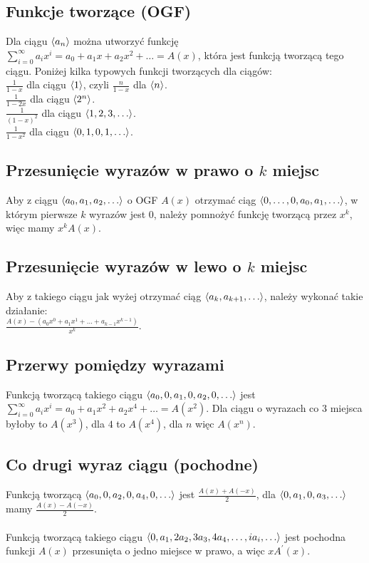 \subsection*{Funkcje tworzące (OGF)}
Dla ciągu $\left\langle a_n \right\rangle$ można utworzyć funkcję 
$\sum\limits_{i=0}^{\infty} a_i x^i = a_0 + a_1 x + a_2 x^2 + \ldots = A(x)$, która
jest funkcją tworzącą tego ciągu. Poniżej kilka typowych funkcji tworzących dla
ciągów: \\
$\frac{1}{1-x}$ dla ciągu $\left\langle 1 \right\rangle$, czyli $\frac{n}{1-x}$ dla $\left\langle n \right\rangle$. \\
$\frac{1}{1-2x}$ dla ciągu $\left\langle 2^n \right\rangle$. \\
$\frac{1}{(1-x)^2}$ dla ciągu $\left\langle 1, 2, 3, \ldots \right\rangle$. \\
$\frac{1}{1-x^2}$ dla ciągu $\left\langle 0, 1, 0, 1, \ldots \right\rangle$. \\

\subsection*{Przesunięcie wyrazów w prawo o $k$ miejsc}
Aby z ciągu $\left\langle a_0, a_1, a_2, \ldots \right\rangle$ o OGF $A(x)$ otrzymać ciąg 
$\left\langle 0, \ldots, 0, a_0, a_1, \ldots \right\rangle$, w którym pierwsze $k$ wyrazów jest $0$,
należy pomnożyć funkcję tworzącą przez $x^k$, więc mamy $x^k A(x)$.

\subsection*{Przesunięcie wyrazów w lewo o $k$ miejsc}
Aby z takiego ciągu jak wyżej otrzymać ciąg $\left\langle a_{k}, a_{k+1}, \ldots \right\rangle$,
należy wykonać takie działanie: \\
$\frac{A(x) - \left( a_0 x^0 + a_1 x^1 + \ldots + a_{k-1} x^{k-1} \right)}{x^k}$.

\subsection*{Przerwy pomiędzy wyrazami}
Funkcją tworzącą takiego ciągu $\left\langle a_0, 0, a_1, 0, a_2, 0, \ldots \right\rangle$ jest
$\sum\limits_{i=0}^{\infty} a_i x^i = a_0 + a_1 x^2 + a_2 x^4 + \ldots = A(x^2)$.
Dla ciągu o wyrazach co $3$ miejsca byłoby to $A(x^3)$, dla $4$ to $A(x^4)$, dla
$n$ więc $A(x^n)$.

\subsection*{Co drugi wyraz ciągu (pochodne)}
Funkcją tworzącą $\left\langle a_0, 0, a_2, 0, a_4, 0, \ldots \right\rangle$ jest 
$\frac{A(x) + A(-x)}{2}$, dla $\left\langle 0, a_1, 0, a_3, \ldots \right\rangle$ mamy
$\frac{A(x) - A(-x)}{2}$. \\ \\
Funkcją tworzącą takiego ciągu 
$\left\langle 0, a_1, 2a_2, 3a_3, 4a_4, \ldots, ia_i, \ldots \right\rangle$
jest pochodna funkcji $A(x)$ przesunięta o jedno miejsce w prawo, a więc $xA^\prime(x)$.

